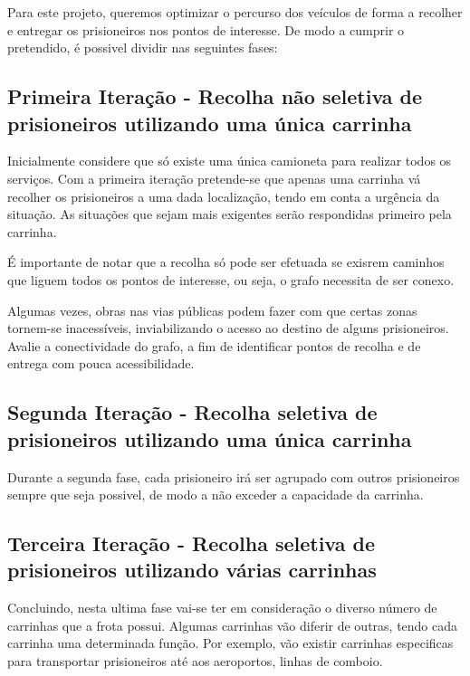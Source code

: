 \documentclass[article, a4paper, 12pt, oneside]{memoir}
\begin{document}
Para este projeto, queremos optimizar o percurso dos veículos de forma a recolher e entregar os prisioneiros nos pontos de interesse. De modo a cumprir o pretendido, é possivel dividir nas seguintes fases:


\subsection{Primeira Iteração - Recolha não seletiva de prisioneiros utilizando uma única carrinha}
	Inicialmente considere que só existe uma única camioneta para realizar todos os serviços.
	Com a primeira iteração pretende-se que apenas uma carrinha vá recolher os prisioneiros a uma dada localização, tendo em conta a urgência da situação. As situações que  sejam mais exigentes serão respondidas primeiro pela carrinha.

	É importante de notar que a recolha só pode ser efetuada se exisrem caminhos que liguem todos os pontos de interesse, ou seja, o grafo necessita de ser conexo.

	Algumas vezes, obras nas vias públicas podem fazer com que certas zonas tornem-se inacessíveis, inviabilizando o acesso ao destino de alguns prisioneiros. Avalie a conectividade do grafo, a fim de identificar pontos de recolha e de entrega com pouca acessibilidade.

\subsection{Segunda Iteração - Recolha seletiva de prisioneiros utilizando uma única carrinha}
	Durante a segunda fase, cada prisioneiro irá ser agrupado com outros prisioneiros sempre que seja possivel, de modo a não exceder a capacidade da carrinha.



\subsection{Terceira Iteração - Recolha seletiva de prisioneiros utilizando várias carrinhas}

	Concluindo, nesta ultima fase vai-se ter em consideração o diverso número de carrinhas que a frota possui. Algumas carrinhas vão diferir de outras, tendo cada carrinha uma determinada função. Por exemplo, vão existir carrinhas especificas para transportar prisioneiros até aos aeroportos, linhas de comboio.


\newpage

\end{document}
